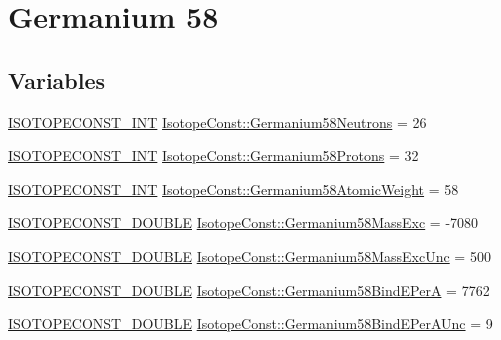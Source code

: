 \hypertarget{group___isotope_const-_germanium-_ge58}{}\section{Germanium 58}
\label{group___isotope_const-_germanium-_ge58}
\subsection*{Variables}
\begin{DoxyCompactItemize}
\item 
\mbox{\hyperlink{group___isotope_const-_macros_ga5f18360b3e99483a35c32d789e62621c}{I\+S\+O\+T\+O\+P\+E\+C\+O\+N\+S\+T\+\_\+\+I\+NT}} \mbox{\hyperlink{group___isotope_const-_germanium-_ge58_gab30d56beed14cf064d7c23633597a8b0}{Isotope\+Const\+::\+Germanium58\+Neutrons}} = 26
\item 
\mbox{\hyperlink{group___isotope_const-_macros_ga5f18360b3e99483a35c32d789e62621c}{I\+S\+O\+T\+O\+P\+E\+C\+O\+N\+S\+T\+\_\+\+I\+NT}} \mbox{\hyperlink{group___isotope_const-_germanium-_ge58_ga4b94380500aca4ce22c8de9ac4d42bac}{Isotope\+Const\+::\+Germanium58\+Protons}} = 32
\item 
\mbox{\hyperlink{group___isotope_const-_macros_ga5f18360b3e99483a35c32d789e62621c}{I\+S\+O\+T\+O\+P\+E\+C\+O\+N\+S\+T\+\_\+\+I\+NT}} \mbox{\hyperlink{group___isotope_const-_germanium-_ge58_ga5db863c927d1391dff7e1e70fa0dcff1}{Isotope\+Const\+::\+Germanium58\+Atomic\+Weight}} = 58
\item 
\mbox{\hyperlink{group___isotope_const-_macros_ga8f45a7272ce02c0b4c65c44636ed719a}{I\+S\+O\+T\+O\+P\+E\+C\+O\+N\+S\+T\+\_\+\+D\+O\+U\+B\+LE}} \mbox{\hyperlink{group___isotope_const-_germanium-_ge58_ga70344290a3a645ab10902e7e7f6fd9c1}{Isotope\+Const\+::\+Germanium58\+Mass\+Exc}} = -\/7080
\item 
\mbox{\hyperlink{group___isotope_const-_macros_ga8f45a7272ce02c0b4c65c44636ed719a}{I\+S\+O\+T\+O\+P\+E\+C\+O\+N\+S\+T\+\_\+\+D\+O\+U\+B\+LE}} \mbox{\hyperlink{group___isotope_const-_germanium-_ge58_ga5ef145a1a9694b8e3b9fecf6adb2e140}{Isotope\+Const\+::\+Germanium58\+Mass\+Exc\+Unc}} = 500
\item 
\mbox{\hyperlink{group___isotope_const-_macros_ga8f45a7272ce02c0b4c65c44636ed719a}{I\+S\+O\+T\+O\+P\+E\+C\+O\+N\+S\+T\+\_\+\+D\+O\+U\+B\+LE}} \mbox{\hyperlink{group___isotope_const-_germanium-_ge58_ga8a6cd7d5e5150436408b5a983421f439}{Isotope\+Const\+::\+Germanium58\+Bind\+E\+PerA}} = 7762
\item 
\mbox{\hyperlink{group___isotope_const-_macros_ga8f45a7272ce02c0b4c65c44636ed719a}{I\+S\+O\+T\+O\+P\+E\+C\+O\+N\+S\+T\+\_\+\+D\+O\+U\+B\+LE}} \mbox{\hyperlink{group___isotope_const-_germanium-_ge58_gac609d1ec48f2887e0e82292ced98d093}{Isotope\+Const\+::\+Germanium58\+Bind\+E\+Per\+A\+Unc}} = 9

\end{DoxyCompactItemize}

